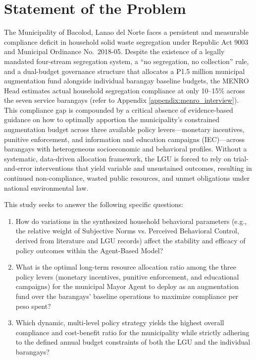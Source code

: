 \section{Statement of the Problem}
The Municipality of Bacolod, Lanao del Norte faces a persistent and measurable compliance deficit in household solid waste segregation under Republic Act 9003 and Municipal Ordinance No.\ 2018-05. Despite the existence of a legally mandated four-stream segregation system, a ``no segregation, no collection'' rule, and a dual-budget governance structure that allocates a ₱1.5 million municipal augmentation fund alongside individual barangay baseline budgets, the MENRO Head estimates actual household segregation compliance at only 10--15\% across the seven service barangays (refer to Appendix \ref{appendix:menro_interview}). This compliance gap is compounded by a critical absence of evidence-based guidance on how to optimally apportion the municipality's constrained augmentation budget across three available policy levers—monetary incentives, punitive enforcement, and information and education campaigns (IEC)—across barangays with heterogeneous socioeconomic and behavioral profiles. Without a systematic, data-driven allocation framework, the LGU is forced to rely on trial-and-error interventions that yield variable and unsustained outcomes, resulting in continued non-compliance, wasted public resources, and unmet obligations under national environmental law.

\noindent This study seeks to answer the following specific questions:

\begin{enumerate}

    \item How do variations in the synthesized household behavioral parameters (e.g., the relative weight of Subjective Norms vs. Perceived Behavioral Control, derived from literature and LGU records) affect the stability and efficacy of policy outcomes within the Agent-Based Model?
    \item What is the optimal long-term resource allocation ratio among the three policy levers (monetary incentives, punitive enforcement, and educational campaigns) for the municipal Mayor Agent to deploy as an augmentation fund over the barangays' baseline operations to maximize compliance per peso spent?
    \item Which dynamic, multi-level policy strategy yields the highest overall compliance and cost-benefit ratio for the municipality while strictly adhering to the defined annual budget constraints of both the LGU and the individual barangays?

\end{enumerate}

